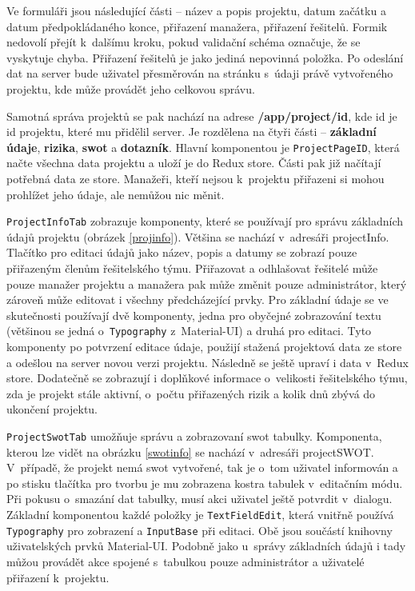 Ve formuláři jsou následující části – název a popis projektu, datum začátku a datum předpokládaného konce, přiřazení manažera, přiřazení řešitelů. Formik nedovolí přejít k~dalšímu kroku, pokud validační schéma označuje, že se vyskytuje chyba. Přiřazení řešitelů je jako jediná nepovinná položka. Po odeslání dat na server bude uživatel přesměrován na stránku s~údaji právě vytvořeného projektu, kde může provádět jeho celkovou správu.

Samotná správa projektů se pak nachází na adrese \textbf{/app/project/id}, kde id je id projektu, které mu přidělil server. Je rozdělena na čtyři části – \textbf{základní údaje}, \textbf{rizika}, \textbf{swot} a \textbf{dotazník}. Hlavní komponentou je \texttt{ProjectPageID}, která načte všechna data projektu a uloží je do Redux store. Části pak již načítají potřebná data ze store. Manažeři, kteří nejsou k~projektu přiřazeni si mohou prohlížet jeho údaje, ale nemůžou nic měnit.

\texttt{ProjectInfoTab} zobrazuje komponenty, které se používají pro správu základních údajů projektu (obrázek \ref{projinfo}). Většina se nachází v~adresáři projectInfo. Tlačítko pro editaci údajů jako název, popis a datumy se zobrazí pouze přiřazeným členům řešitelského týmu. Přiřazovat a odhlašovat řešitelé může pouze manažer projektu a manažera pak může změnit pouze administrátor, který zároveň může editovat i všechny předcházející prvky. Pro základní údaje se ve skutečnosti používají dvě komponenty, jedna pro obyčejné zobrazování textu (většinou se jedná o~\texttt{Typography} z~Material-UI) a druhá pro editaci. Tyto komponenty po potvrzení editace údaje, použijí stažená projektová data ze store a odešlou na server novou verzi projektu. Následně se ještě upraví i data v~Redux store. Dodatečně se zobrazují i doplňkové informace o~velikosti řešitelského týmu, zda je projekt stále aktivní, o~počtu přiřazených rizik a kolik dnů zbývá do ukončení projektu.

    
    
\texttt{ProjectSwotTab} umožňuje správu a zobrazovaní swot tabulky. Komponenta, kterou lze vidět na obrázku \ref{swotinfo} se nachází v~adresáři projectSWOT. V~případě, že projekt nemá swot vytvořené, tak je o~tom uživatel informován a po stisku tlačítka pro tvorbu je mu zobrazena kostra tabulek v~editačním módu. Při pokusu o~smazání dat tabulky, musí akci uživatel ještě potvrdit v~dialogu. Základní komponentou každé položky je \texttt{TextFieldEdit}, která vnitřně používá \texttt{Typography} pro zobrazení a \texttt{InputBase} při editaci. Obě jsou součástí knihovny uživatelských prvků Material-UI. Podobně jako u~správy základních údajů i tady můžou provádět akce spojené s~tabulkou pouze administrátor a uživatelé přiřazení k~projektu.

